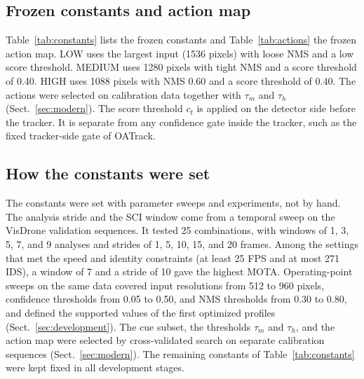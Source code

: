 \subsection{Frozen constants and action map}
Table~\ref{tab:constants} lists the frozen constants and
Table~\ref{tab:actions} the frozen action map. LOW uses the largest input
(1536 pixels) with loose NMS and a low score threshold. MEDIUM uses 1280
pixels with tight NMS and a score threshold of 0.40. HIGH uses 1088 pixels
with NMS 0.60 and a score threshold of 0.40. The actions were selected on
calibration data together with $\tau_m$ and $\tau_h$
(Sect.~\ref{sec:modern}). The score threshold $c_t$ is applied on the detector
side before the tracker. It is separate from any confidence gate inside the
tracker, such as the fixed tracker-side gate of OATrack.

\subsection{How the constants were set}\label{sec:constants}
The constants were set with parameter sweeps and experiments, not by hand.
The analysis stride and the SCI window come from a temporal sweep on the
VisDrone validation sequences. It tested 25 combinations, with windows of 1,
3, 5, 7, and 9 analyses and strides of 1, 5, 10, 15, and 20 frames. Among the
settings that met the speed and identity constraints (at least 25 FPS and at
most 271 IDS), a window of 7 and a stride of 10 gave the highest MOTA.
Operating-point sweeps on the same data covered input resolutions from 512 to
960 pixels, confidence thresholds from 0.05 to 0.50, and NMS thresholds from
0.30 to 0.80, and defined the supported values of the first optimized
profiles (Sect.~\ref{sec:development}). The cue subset, the thresholds $\tau_m$
and $\tau_h$, and the action map were selected by cross-validated search on
separate calibration sequences (Sect.~\ref{sec:modern}). The remaining
constants of Table~\ref{tab:constants} were kept fixed in all development
stages.

